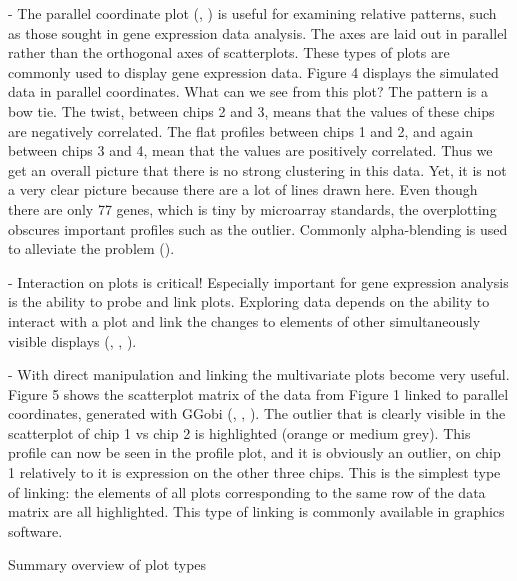 \documentclass[11pt,a4paper,oldfontcommands,openany]{memoir}
\numberwithin{equation}{section} %
\begin{document}
- The parallel coordinate plot (\citealt{origPCP}, \citealt{origPCP2}) is useful for examining relative patterns, such as those sought in gene expression data analysis. The axes are laid out in parallel rather than the orthogonal axes of scatterplots. These types of plots are commonly used to display gene expression data. Figure 4 displays the simulated data in parallel coordinates. What can we see from this plot? The pattern is a bow tie. The twist, between chips 2 and 3, means that the values of these chips are negatively correlated. The flat profiles between chips 1 and 2, and again between chips 3 and 4, mean that the values are positively correlated. Thus we get an overall picture that there is no strong clustering in this data. Yet, it is not a very clear picture because there are a lot of lines drawn here. Even though there are only 77 genes, which is tiny by microarray standards, the overplotting obscures important profiles such as the outlier. Commonly alpha-blending is used to alleviate the problem (\citealt{jds}).

- Interaction on plots is critical! Especially important for gene expression analysis is the ability to probe and link plots. Exploring data depends on the ability to interact with a plot and link the changes to elements of other simultaneously visible displays (\citealt{interact}, \citealt{interact2}, \citealt{interact3}).

- With direct manipulation and linking the multivariate plots become very useful. Figure 5 shows the scatterplot matrix of the data from Figure 1 linked to parallel coordinates, generated with GGobi (\citealt{ggobi}, \citealt{ggobi2}, \citealt{ggobi3}). The outlier that is clearly visible in the scatterplot of chip 1 vs chip 2 is highlighted (orange or medium grey). This profile can now be seen in the profile plot, and it is obviously an outlier, on chip 1 relatively to it is expression on the other three chips. This is the simplest type of linking: the elements of all plots corresponding to the same row of the data matrix are all highlighted. This type of linking is commonly available in graphics software.

Summary overview of plot types
\end{document}
